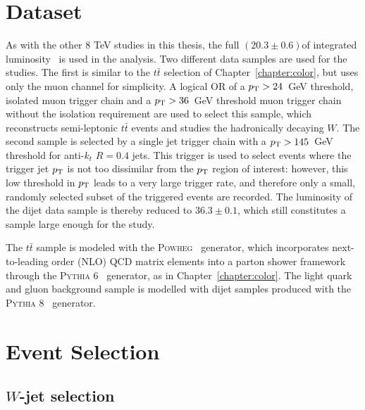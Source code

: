 \section{Dataset}

As with the other 8 TeV studies in this thesis, the full $(20.3\pm0.6)$\invfb of integrated luminosity~\cite{ATLAS-CONF-2011-116} is used in the analysis. Two different data samples are used for the studies. The first is similar to the $t\bar{t}$ selection of Chapter~\ref{chapter:color}, but uses only the muon channel for simplicity. A logical OR of a $p_{\rm T}>24$~GeV threshold, isolated muon trigger chain and a $p_{\rm T}>36$~GeV threshold muon trigger chain without the isolation requirement are used to select this sample, which reconstructs semi-leptonic $t\bar{t}$ events and studies the hadronically decaying $W$. The second sample is selected by a single jet trigger chain with a $p_{\rm T}>145$~GeV threshold for anti-$k_t$ $R=0.4$ jets. This trigger is used to select events where the trigger jet $p_{\rm T}$ is not too dissimilar from the $p_{\rm T}$ region of interest: however, this low threshold in $p_{\rm T}$ leads to a very large trigger rate, and therefore only a small, randomly selected subset of the triggered events are recorded. The luminosity of the dijet data sample is thereby reduced to $36.3\pm0.1$\invpb, which still constitutes a sample large enough for the study.

The $t\bar{t}$ sample is modeled with the \textsc{Powheg}~\cite{Nason:2004rx,Frixione:2007vw} generator, which incorporates next-to-leading order (NLO) QCD matrix elements into a parton shower framework through the \textsc{Pythia 6}~\cite{pythia} generator, as in Chapter~\ref{chapter:color}. The light quark and gluon background sample is modelled with dijet samples produced with the \textsc{Pythia 8}~\cite{pythia8} generator. 


\section{Event Selection}

\subsection{$W$-jet selection}


